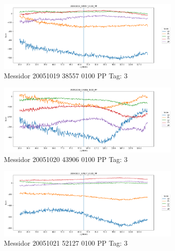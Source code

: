 \begin{figure}[ht!]
	\centering
	\begin{subfigure}[b]{ 0.85\textwidth}
		\centering
		\includegraphics[width=\textwidth]{Figures/chapter_stability/20051019_38557_0100_PP/l/scores.png}
		\caption{Messidor 20051019 38557 0100 PP Tag: 3}				
	\end{subfigure}	
	\begin{subfigure}[b]{ 0.85\textwidth}
		\centering
		\includegraphics[width=\textwidth]{Figures/chapter_stability/20051020_43906_0100_PP/l/scores.png}
		\caption{Messidor 20051020 43906 0100 PP Tag: 3}				
	\end{subfigure}	
	\begin{subfigure}[b]{ 0.85\textwidth}
		\centering
		\includegraphics[width=\textwidth]{Figures/chapter_stability/20051021_52127_0100_PP/l/scores.png}
		\caption{Messidor 20051021 52127 0100 PP Tag: 3}				
	\end{subfigure}	
	\begin{subfigure}[b]{ 0.85\textwidth}

\end{subfigure}
\end{figure}
